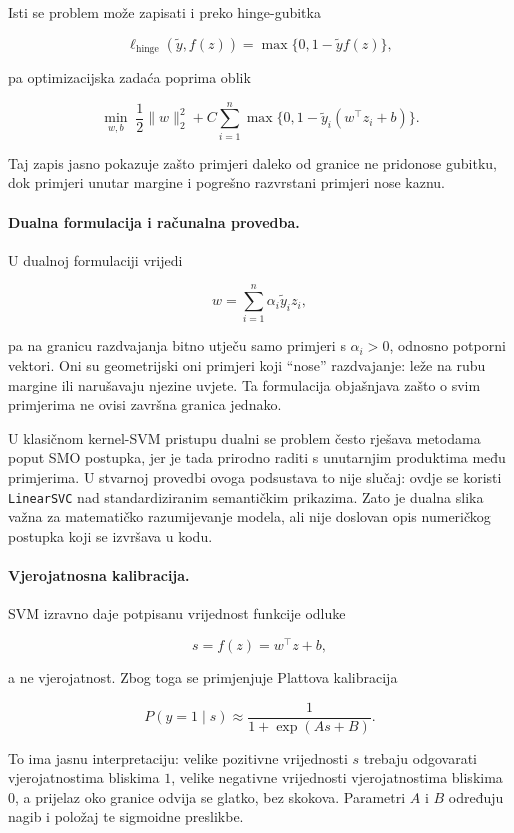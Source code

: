 \documentclass{article}
\begin{document}
Isti se problem može zapisati i preko hinge-gubitka

\[
\ell_{\mathrm{hinge}}(\tilde y,f(z)) = \max\{0,1-\tilde y f(z)\},
\]

pa optimizacijska zadaća poprima oblik

\[
\min_{w,b}\;\frac{1}{2}\|w\|_2^2 + C\sum_{i=1}^n \max\{0,1-\tilde y_i(w^\top z_i+b)\}.
\]

Taj zapis jasno pokazuje zašto primjeri daleko od granice ne pridonose gubitku, dok primjeri unutar margine i pogrešno razvrstani primjeri nose kaznu.

\paragraph{Dualna formulacija i računalna provedba.}
U dualnoj formulaciji vrijedi

\[
w=\sum_{i=1}^n \alpha_i \tilde y_i z_i,
\]

pa na granicu razdvajanja bitno utječu samo primjeri s $\alpha_i>0$, odnosno potporni vektori. Oni su geometrijski oni primjeri koji ``nose'' razdvajanje: leže na rubu margine ili narušavaju njezine uvjete. Ta formulacija objašnjava zašto o svim primjerima ne ovisi završna granica jednako.

U klasičnom kernel-SVM pristupu dualni se problem često rješava metodama poput SMO postupka, jer je tada prirodno raditi s unutarnjim produktima među primjerima. U stvarnoj provedbi ovoga podsustava to nije slučaj: ovdje se koristi \texttt{LinearSVC} nad standardiziranim semantičkim prikazima. Zato je dualna slika važna za matematičko razumijevanje modela, ali nije doslovan opis numeričkog postupka koji se izvršava u kodu.

\paragraph{Vjerojatnosna kalibracija.}
SVM izravno daje potpisanu vrijednost funkcije odluke

\[
s=f(z)=w^\top z+b,
\]

a ne vjerojatnost. Zbog toga se primjenjuje Plattova kalibracija

\[
P(y=1\mid s)\approx \frac{1}{1+\exp(As+B)}.
\]

To ima jasnu interpretaciju: velike pozitivne vrijednosti $s$ trebaju odgovarati vjerojatnostima bliskima $1$, velike negativne vrijednosti vjerojatnostima bliskima $0$, a prijelaz oko granice odvija se glatko, bez skokova. Parametri $A$ i $B$ određuju nagib i položaj te sigmoidne preslikbe.
\end{document}
